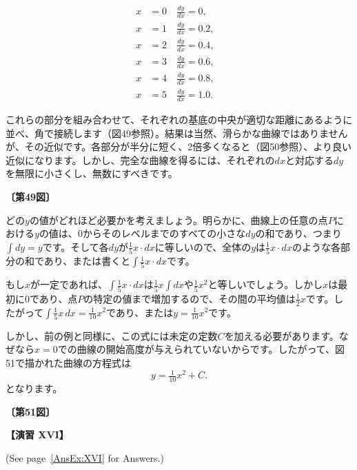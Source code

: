 \documentclass[a4paper,11pt,openany]{ltjsbook}
\newcommand{\Pageref}[2][p.]{#1~\ref{#2}}
\begin{document}
\begin{align*}
x &= 0 \quad \frac{dy}{dx} = 0, &  \\
x &= 1 \quad \frac{dy}{dx} = 0.2, &  \\
x &= 2 \quad \frac{dy}{dx} = 0.4, &  \\
x &= 3 \quad \frac{dy}{dx} = 0.6, &  \\
x &= 4 \quad \frac{dy}{dx} = 0.8, &  \\
x &= 5 \quad \frac{dy}{dx} = 1.0. & 
\end{align*}

これらの部分を組み合わせて、それぞれの基底の中央が適切な距離にあるように並べ、角で接続します（図49参照）。結果は当然、滑らかな曲線ではありませんが、その近似です。各部分が半分に短く、2倍多くなると（図50参照）、より良い近似になります。しかし、完全な曲線を得るには、それぞれの$dx$と対応する$dy$を無限に小さくし、無数にすべきです。

\par\textbf{〔第49図〕}\par

どの$y$の値がどれほど必要かを考えましょう。明らかに、曲線上の任意の点$P$における$y$の値は、$0$からそのレベルまでのすべての小さな$dy$の和であり、つまり$\displaystyle \int dy = y$です。そして各$dy$が$\frac{1}{5}x \cdot dx$に等しいので、全体の$y$は$\frac{1}{5}x \cdot dx$のような各部分の和であり、または書くと$\displaystyle \int \tfrac{1}{5}x \cdot dx$です。

もし$x$が一定であれば、$\displaystyle \int \tfrac{1}{5}x \cdot dx$は$\frac{1}{5} x \displaystyle \int dx$や$\frac{1}{5}x^2$と等しいでしょう。しかし$x$は最初に$0$であり、点$P$の特定の値まで増加するので、その間の平均値は$\frac{1}{2}x$です。したがって$\displaystyle \int \tfrac{1}{5} x \, dx = \tfrac{1}{10} x^2$であり、または$y=\tfrac{1}{10}x^2$です。

しかし、前の例と同様に、この式には未定の定数$C$を加える必要があります。なぜなら$x=0$での曲線の開始高度が与えられていないからです。したがって、図51で描かれた曲線の方程式は
\[
y = \tfrac{1}{10}x^2 + C.
\]
となります。

\par\textbf{〔第51図〕}\par

\par\textbf{【演習 XVI】}\par (See \Pageref[page]{AnsEx:XVI} for Answers.)
\end{document}
